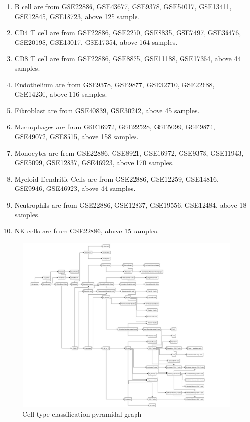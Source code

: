 \documentclass{article}
\begin{document}
\begin{enumerate}
     \item B cell are from GSE22886, GSE43677, GSE9378, GSE54017, GSE13411, GSE12845, GSE18723, above 125 sample.
     \item CD4 T cell are from GSE22886, GSE2270, GSE8835, GSE7497, GSE36476, GSE20198, GSE13017, GSE17354, above 164 samples.
     \item CD8 T cell are from GSE22886, GSE8835, GSE11188, GSE17354, above 44 samples.
     \item Endothelium are from GSE9378, GSE9877, GSE32710, GSE22688, GSE14230, above 116 samples.
     \item Fibroblast are from GSE40839, GSE30242, above 45 samples.
     \item Macrophages are from GSE16972, GSE22528, GSE5099, GSE9874, GSE49072, GSE8515, above 158 samples.
     \item Monocytes are from GSE22886, GSE8921, GSE16972, GSE9378, GSE11943, GSE5099, GSE12837, GSE46923, above 170 samples.
     \item Myeloid Dendritic Cells are from GSE22886, GSE12259, GSE14816, GSE9946, GSE46923, above 44 samples.
     \item Neutrophils are from GSE22886, GSE12837, GSE19556, GSE12484, above 18 samples.
     \item NK cells are from GSE22886, above 15 samples.
\end{enumerate}
\begin{figure}[H]
     \centering
     \includegraphics[width=5in]{pic/celltype.jpeg}
     \caption{Cell type classification pyramidal graph}
     \label{fig:f1}
\end{figure}
\end{document}
